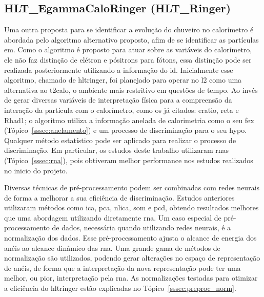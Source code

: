 \subsection{HLT\_EgammaCaloRinger (HLT\_Ringer)}
\label{ssec:hlt_ringer}


Uma outra proposta para se identificar a evolução do chuveiro no calorímetro é 
abordada pelo algoritmo alternativo proposto, afim de se identificar as
partículas \gls{em}. Como o algoritmo é proposto para atuar sobre as variáveis
do calorímetro, ele não faz distinção de elétron e pósitrons para fótons, essa
distinção pode ser realizada posteriormente utilizando a informação do \gls{id}.
Inicialmente esse algoritmo, chamado de \gls{hltringer}, foi planejado para operar no
\acrlong{l2} como uma alternativa ao \gls{t2calo}, o ambiente mais restritivo 
em questões de tempo. Ao invés de gerar diversas variáveis de interpretação física 
para a compreensão da interação da partícula com o calorímetro, como os já
citados: \gls{eratio}, \gls{reta} e \gls{Rhad1}; o algoritmo utiliza a informação anelada
de calorimetria como o seu \gls{fex} (Tópico~\ref{sssec:anelamento}) 
e um processo de discriminação para o seu \gls{hypo}. Qualquer método estatístico 
pode ser aplicado para realizar o processo de discriminação. 
Em particular, os estudos deste trabalho utilizaram \glspl{rna} \cite{neural_networks} 
(Tópico~\ref{sssec:rna}), pois obtiveram melhor performance nos estudos
realizados no inicio do projeto.

Diversas técnicas de pré-processamento podem ser combinadas com redes neurais de
forma a melhorar a sua eficiência de discriminação. Estudos anteriores
\cite{tese_eduardo,tese_torres} utilizaram métodos como \gls{ica}, \gls{pca},
\gls{nlica}, \gls{som} e \gls{pcd}, obtendo resultados melhores que uma
abordagem utilizando diretamente \gls{rna}. Um caso especial de pré-processamento 
de dados, necessária quando utilizando redes neurais, é a normalização dos dados. Esse 
pré-processamento ajusta o alcance de energia dos anéis ao alcance dinâmico das
\gls{rna}. Uma grande gama de métodos de normalização são utilizados, podendo
gerar alterações no espaço de representação de anéis, de forma que a
interpretação da nova representação pode ter uma melhor, ou pior, interpretação
pela \gls{rna}. As normalizações testadas para otimizar a eficiência do
\gls{hltringer} estão explicadas no Tópico~\ref{sssec:preproc_norm}.

